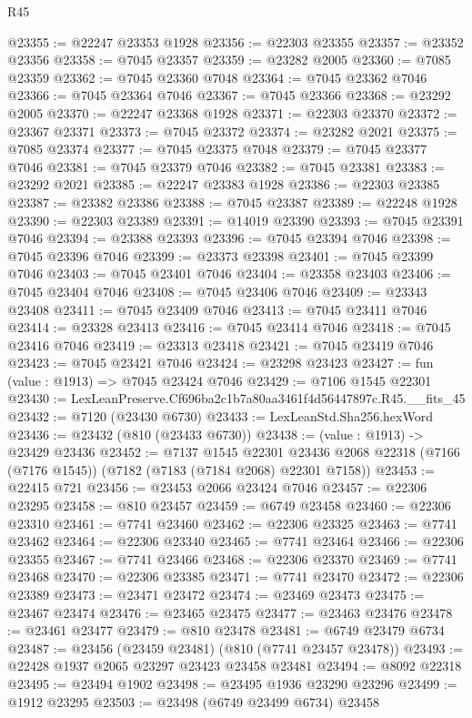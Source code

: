 \begin{lexlean}{R45}
\begin{coremodule}
{@23355 := @22247 @23353 @1928
@23356 := @22303 @23355
@23357 := @23352 @23356
@23358 := @7045 @23357
@23359 := @23282 @2005
@23360 := @7085 @23359
@23362 := @7045 @23360 @7048
@23364 := @7045 @23362 @7046
@23366 := @7045 @23364 @7046
@23367 := @7045 @23366
@23368 := @23292 @2005
@23370 := @22247 @23368 @1928
@23371 := @22303 @23370
@23372 := @23367 @23371
@23373 := @7045 @23372
@23374 := @23282 @2021
@23375 := @7085 @23374
@23377 := @7045 @23375 @7048
@23379 := @7045 @23377 @7046
@23381 := @7045 @23379 @7046
@23382 := @7045 @23381
@23383 := @23292 @2021
@23385 := @22247 @23383 @1928
@23386 := @22303 @23385
@23387 := @23382 @23386
@23388 := @7045 @23387
@23389 := @22248 @1928
@23390 := @22303 @23389
@23391 := @14019 @23390
@23393 := @7045 @23391 @7046
@23394 := @23388 @23393
@23396 := @7045 @23394 @7046
@23398 := @7045 @23396 @7046
@23399 := @23373 @23398
@23401 := @7045 @23399 @7046
@23403 := @7045 @23401 @7046
@23404 := @23358 @23403
@23406 := @7045 @23404 @7046
@23408 := @7045 @23406 @7046
@23409 := @23343 @23408
@23411 := @7045 @23409 @7046
@23413 := @7045 @23411 @7046
@23414 := @23328 @23413
@23416 := @7045 @23414 @7046
@23418 := @7045 @23416 @7046
@23419 := @23313 @23418
@23421 := @7045 @23419 @7046
@23423 := @7045 @23421 @7046
@23424 := @23298 @23423
@23427 := fun (value : @1913) => @7045 @23424 @7046
@23429 := @7106 @1545 @22301
@23430 := LexLeanPreserve.Cf696ba2c1b7a80aa3461f4d56447897c.R45.__fits_45
@23432 := @7120 (@23430 @6730)
@23433 := LexLeanStd.Sha256.hexWord
@23436 := @23432 (@810 (@23433 @6730))
@23438 := (value : @1913) -> @23429 @23436
@23452 := @7137
    @1545
    @22301
    @23436
    @2068
    @22318
    (@7166 (@7176 @1545))
    (@7182 (@7183 (@7184 @2068) @22301 @7158))
@23453 := @22415 @721
@23456 := @23453 @2066 @23424 @7046
@23457 := @22306 @23295
@23458 := @810 @23457
@23459 := @6749 @23458
@23460 := @22306 @23310
@23461 := @7741 @23460
@23462 := @22306 @23325
@23463 := @7741 @23462
@23464 := @22306 @23340
@23465 := @7741 @23464
@23466 := @22306 @23355
@23467 := @7741 @23466
@23468 := @22306 @23370
@23469 := @7741 @23468
@23470 := @22306 @23385
@23471 := @7741 @23470
@23472 := @22306 @23389
@23473 := @23471 @23472
@23474 := @23469 @23473
@23475 := @23467 @23474
@23476 := @23465 @23475
@23477 := @23463 @23476
@23478 := @23461 @23477
@23479 := @810 @23478
@23481 := @6749 @23479 @6734
@23487 := @23456 (@23459 @23481) (@810 (@7741 @23457 @23478))
@23493 := @22428 @1937 @2065 @23297 @23423 @23458 @23481
@23494 := @8092 @22318
@23495 := @23494 @1902
@23498 := @23495 @1936 @23290 @23296
@23499 := @1912 @23295
@23503 := @23498 (@6749 @23499 @6734) @23458
}
\end{coremodule}
\end{lexlean}

